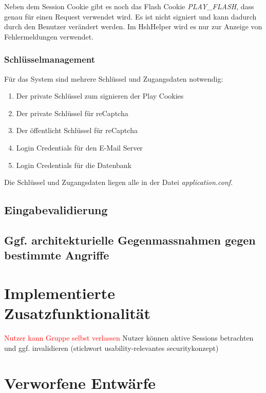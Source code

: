 \documentclass[12pt,DIV14,BCOR10mm,a4paper,twoside,parskip=half-,headsepline,headinclude,english,ngerman,bibliography=totocnumbered]{scrreprt}
\begin{document}
Neben dem Session Cookie gibt es noch das Flash Cookie \textit{PLAY\_FLASH}, dass genau für einen Request verwendet wird. Es ist nicht signiert und kann dadurch durch den Benutzer verändert werden. Im HshHelper wird es nur zur Anzeige von Fehlermeldungen verwendet.

\subsection{Schlüsselmanagement}
Für das System sind mehrere Schlüssel und Zugangsdaten notwendig:

\begin{enumerate}
	\item Der private Schlüssel zum signieren der Play Cookies
	\item Der private Schlüssel für reCaptcha
	\item Der öffentlicht Schlüssel für reCaptcha
	\item Login Credentials für den E-Mail Server
	\item Login Credentials für die Datenbank
\end{enumerate}

Die Schlüssel und Zugangsdaten liegen alle in der Datei \textit{application.conf}.

\section{Eingabevalidierung}

\section{Ggf. architekturielle Gegenmassnahmen gegen bestimmte Angriffe}

\chapter{Implementierte Zusatzfunktionalität}

\textcolor{red}{Nutzer kann Gruppe selbst verlassen}
Nutzer können aktive Sessions betrachten und ggf. invalidieren (stichwort usability-relevantes securitykonzept)

\chapter{Verworfene Entwärfe}
\end{document}
